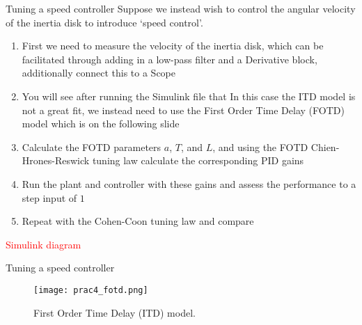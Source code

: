 \documentclass[9pt]{beamer-control}
\begin{document}
\begin{frame}{Tuning a speed controller}
Suppose we instead wish to control the angular velocity of the inertia disk to introduce `speed control'. 

\begin{enumerate}
	\item First we need to measure the velocity of the inertia disk, which can be facilitated through adding in a low-pass filter and a Derivative block, additionally connect this to a Scope
	\item You will see after running the Simulink file that In this case the ITD model is not a great fit, we instead need to use the First Order Time Delay (FOTD) model which is on the following slide
	\item Calculate the FOTD parameters $a$, $T$, and $L$, and using the FOTD Chien-Hrones-Reswick tuning law calculate the corresponding PID gains
	\item Run the plant and controller with these gains and assess the performance to a step input of $1$
	\item Repeat with the Cohen-Coon tuning law and compare
	
\end{enumerate}

\textcolor{red}{Simulink diagram}

\end{frame}

\begin{frame}{Tuning a speed controller}
	\begin{figure}
	\centering
	\texttt{[image: prac4\_fotd.png]}
	\caption{First Order Time Delay (ITD) model.}
\end{figure}
\end{frame}


\end{document}
